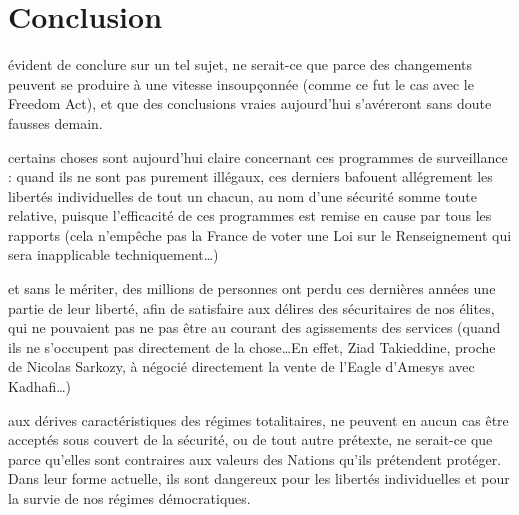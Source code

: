 \chapter{Conclusion}
\label{ch:conclu}

 évident de conclure sur un tel sujet, ne serait-ce que
parce des changements peuvent se produire à une vitesse insoupçonnée (comme ce
fut le cas avec le Freedom Act), et que des conclusions vraies aujourd'hui
s'avéreront sans doute fausses demain.

 certains choses sont aujourd'hui claire
concernant ces programmes de surveillance : quand ils ne sont pas purement
illégaux, ces derniers bafouent allégrement les libertés individuelles de tout
un chacun, au nom d'une sécurité somme toute relative, puisque l'efficacité de
ces programmes est remise en cause par tous les rapports (cela n'empêche pas la
France de voter une Loi sur le Renseignement qui sera inapplicable
techniquement\ldots)

 et sans le mériter, des millions de personnes ont
perdu ces dernières années une partie de leur liberté, afin de satisfaire aux
délires des sécuritaires de nos élites, qui ne pouvaient pas ne pas être au
courant des agissements des services (quand ils ne s'occupent pas directement de
la chose\ldots En effet, Ziad Takieddine, proche de Nicolas Sarkozy, à négocié
directement la vente de l'Eagle d'Amesys avec Kadhafi\ldots)

 aux dérives caractéristiques des régimes
totalitaires, ne peuvent en aucun cas être acceptés sous couvert de la sécurité, ou de tout autre
prétexte, ne serait-ce que parce qu'elles sont contraires aux valeurs des
Nations qu'ils prétendent protéger.  Dans leur forme actuelle, ils sont
dangereux pour les libertés individuelles et pour la survie de nos régimes
démocratiques.
